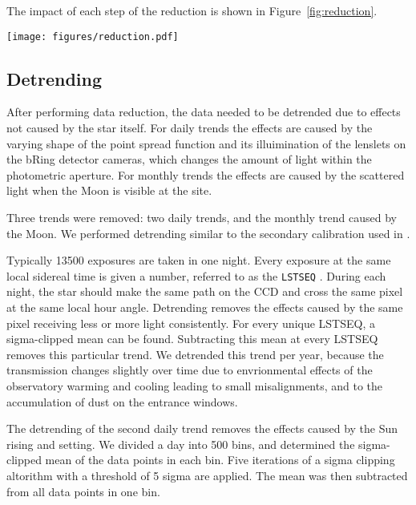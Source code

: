 \documentclass{aa}
\begin{document}
The impact of each step of the reduction is shown in Figure~\ref{fig:reduction}.

\begin{figure*}
    \centering
    \texttt{[image: figures/reduction.pdf]}
    \caption{The first three steps of the data reduction are shown here. The first plot shows the raw data that was saved by bRing. The second plot shows the data without the long exposures. Lastly, the data without the bad photometry and astrometry flags is plotted. The time is displayed on the horizontal axis in Julian Date and the apparent magnitude is displayed on the vertical axis.}
    \label{fig:reduction}
\end{figure*}

\subsection{Detrending}

After performing data reduction, the data needed to be detrended due to effects not caused by the star itself.
%
For daily trends the effects are caused by the varying shape of the point spread function and its illuimination of the lenslets on the bRing detector cameras, which changes the amount of light within the photometric aperture.
%
For monthly trends the effects are caused by the scattered light when the Moon is visible at the site.

Three trends were removed: two daily trends, and the monthly trend caused by the Moon.
%
We performed detrending similar to the secondary calibration used in \cite{Talens_2018}.

Typically 13500 exposures are taken in one night.
%
Every exposure at the same local sidereal time is given a number, referred to as the {\tt LSTSEQ} \citep{Talens_2018}.
%
During each night, the star should make the same path on the CCD and cross the same pixel at the same local hour angle.
%
Detrending removes the effects caused by the same pixel receiving less or more light consistently.
%
For every unique LSTSEQ, a sigma-clipped mean can be found.
%
Subtracting this mean at every LSTSEQ removes this particular trend.
%
We detrended this trend per year, because the transmission changes slightly over time due to envrionmental effects of the observatory warming and cooling leading to small misalignments, and to the accumulation of dust on the entrance windows.


The detrending of the second daily trend removes the effects caused by the Sun rising and setting.
%
We divided a day into 500 bins, and determined the sigma-clipped mean of the data points in each bin.
%
Five iterations of a sigma clipping altorithm with a threshold of 5 sigma are applied.
%
%
The mean was then subtracted from all data points in one bin.
\end{document}
